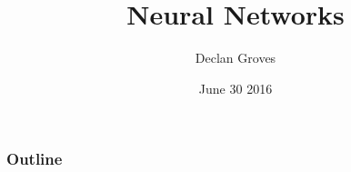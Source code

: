 \documentclass[t]{beamer}
\title{Neural Networks}
\author{Declan Groves}
\date{June 30 2016}
\begin{document}
\begin{frame}
\titlepage
\end{frame}

\begin{frame}
\frametitle{Outline}
\tableofcontents
\end{frame}


\end{document}
